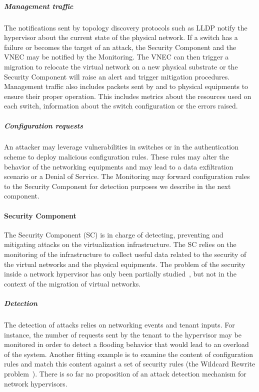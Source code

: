 \subparagraph{Management traffic} 
The notifications sent by topology discovery protocols such as LLDP notify the hypervisor about the current state of the physical network. If a switch has a failure or becomes the target of an attack, the Security Component and the VNEC may be notified by the Monitoring. The VNEC can then trigger a migration to relocate the virtual network on a new physical substrate or the Security Component will raise an alert and trigger mitigation procedures.
Management traffic also includes packets sent by and to physical equipments to ensure their proper operation.
This includes metrics about the resources used on each switch, information about the switch configuration or the errors raised.

\subparagraph{Configuration requests} An attacker may leverage vulnerabilities in switches or in the authentication scheme to deploy malicious configuration rules. These rules may alter the behavior of the networking equipments and may lead to a data exfiltration scenario or a Denial of Service.
The Monitoring may forward configuration rules to the Security Component for detection purposes we describe in the next component.

\paragraph{Security Component}
The Security Component (SC) is in charge of detecting, preventing and mitigating attacks on the virtualization infrastructure. The SC relies on the monitoring of the infrastructure to collect useful data related to the security of the virtual networks and the physical equipments.
The problem of the security inside a network hypervisor has only been partially studied~\cite{Costa2015}, but not in the context of the migration of virtual networks.

\subparagraph{Detection}
The detection of attacks relies on networking events and tenant inputs.
For instance, the number of requests sent by the tenant to the hypervisor may be monitored in order to detect a flooding behavior that would lead to an overload of the system. Another fitting example is to examine the content of configuration rules and match this content against a set of security rules (\eg the Wildcard Rewrite problem~\cite{Costa2015}).
There is so far no proposition of an attack detection mechanism for network hypervisors.

